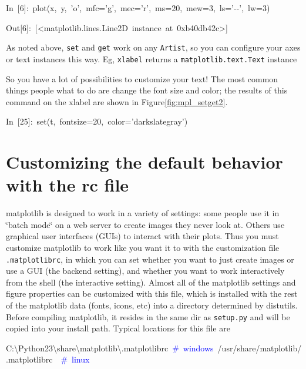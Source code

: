 \begin{lyxcode}


In~{[}6]:~plot(x,~y,~'o',~mfc='g',~mec='r',~ms=20,~mew=3,~ls='-{}-',~lw=3)

Out{[}6]:~{[}<matplotlib.lines.Line2D~instance~at~0xb40db42c>]


\end{lyxcode}
As noted above, \texttt{set} and \texttt{get} work on any \texttt{Artist},
so you can configure your axes or text instances this way.  Eg, \texttt{xlabel}
returns a \texttt{matplotlib.text.Text} instance 

\begin{lyxcode}

\end{lyxcode}
So you have a lot of possibilities to customize your text!  The most
common things people what to do are change the font size and color;
the results of this command on the xlabel are shown in Figure\ref{fig:mpl_setget2}.

\begin{lyxcode}


In~{[}25]:~set(t,~fontsize=20,~color='darkslategray')~
\end{lyxcode}


\section[matplotlibrc]{Customizing the default behavior with the rc file}

matplotlib is designed to work in a variety of settings: some people
use it in \char`\"{}batch mode\char`\"{} on a web server to create
images they never look at. Others use graphical user interfaces (GUIs)
to interact with their plots. Thus you must customize matplotlib to
work like you want it to with the customization file \texttt{.matplotlibrc},
in which you can set whether you want to just create images or use
a GUI (the backend setting), and whether you want to work interactively
from the shell (the interactive setting). Almost all of the matplotlib
settings and figure properties can be customized with this file, which
is installed with the rest of the matplotlib data (fonts, icons, etc)
into a directory determined by distutils. Before compiling matplotlib,
it resides in the same dir as \texttt{setup.py} and will be copied
into your install path. Typical locations for this file are 

\begin{lyxcode}
C:\textbackslash{}Python23\textbackslash{}share\textbackslash{}matplotlib\textbackslash{}.matplotlibrc~\textcolor{blue}{\#~windows}~/usr/share/matplotlib/.matplotlibrc~~\textcolor{blue}{\#~linux}
\end{lyxcode}

